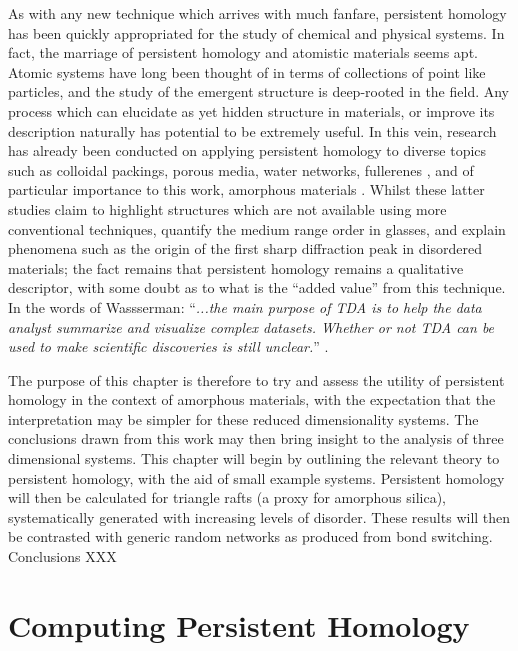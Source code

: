 As with any new technique which arrives with much fanfare, persistent homology has been quickly appropriated for the study of chemical and physical systems.
In fact, the marriage of persistent homology and atomistic materials seems apt.
Atomic systems have long been thought of in terms of collections of point like particles, and the study of the emergent structure is deep\--rooted in the field.
Any process which can elucidate as yet hidden structure in materials, or improve its description naturally has potential to be extremely useful.
In this vein, research has already been conducted on applying persistent homology to diverse topics such as colloidal packings, porous media, water networks, fullerenes \cite{Carter2018,Robins2017,Jiang2018,Steinberg2019,Xia2015}, and of particular importance to this work, amorphous materials \cite{Hiraoka2016,Onodera2019,Nakamura2015,Gutierrez2019}.
Whilst these latter studies claim to highlight structures which are not available using more conventional techniques, quantify the medium range order in glasses, and explain phenomena such as the origin of the first sharp diffraction peak in disordered materials; the fact remains that persistent homology remains a qualitative descriptor, with some doubt as to what is the ``added value'' from this technique. 
In the words of Wassserman: ``\textit{...the main purpose of TDA is to help the data analyst summarize and visualize
complex datasets. Whether or not TDA can be used to make scientific discoveries is still unclear.}'' \cite{Wasserman2018}.

The purpose of this chapter is therefore to try and assess the utility of persistent homology in the context of \td{} amorphous materials, with the expectation that the interpretation may be simpler for these reduced dimensionality systems.
The conclusions drawn from this work may then bring insight to the analysis of three dimensional systems.
This chapter will begin by outlining the relevant theory to persistent homology, with the aid of small example systems.
Persistent homology will then be calculated for triangle rafts (a proxy for amorphous silica), systematically generated with increasing levels of disorder.
These results will then be contrasted with generic random networks as produced from bond switching.
Conclusions XXX

\section{Computing Persistent Homology}

